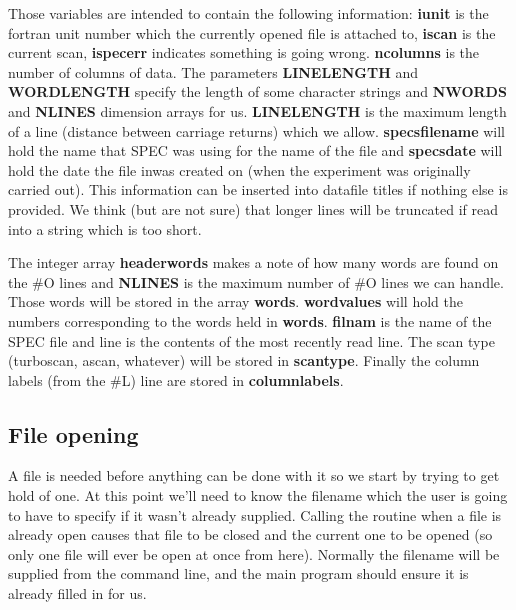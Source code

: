 \documentclass[10pt,a4paper,notitlepage]{article}
\newcommand{\var}[1]{\textbf{\textsf{#1}}} %
\newcommand{\param}[1]{\textbf{\textsf{#1}}} %
\begin{document}
Those variables are intended to contain the following information: \var{iunit} 
is the fortran unit number which the currently opened file is attached to,
\var{iscan} is the current scan, \var{ispecerr} indicates something is going 
wrong. 
\var{ncolumns} is the number of columns of data.
The parameters \param{LINELENGTH} and \param{WORDLENGTH} specify the length 
of some character strings and
\param{NWORDS} and \param{NLINES} dimension arrays for us. 
\param{LINELENGTH} is the maximum length of a line (distance between 
carriage returns) which we allow. 
\var{specsfilename} will hold the name that SPEC was using for the name
of the file and \var{specsdate} will hold the date the file
inwas created on (when the experiment was originally carried out). 
This information can be inserted into datafile titles if nothing else is
provided.
We think (but are not sure) that longer lines will be truncated if read into
a string which is too short.

The integer array \var{headerwords} makes a note of how many 
words are found on the 
\#O lines and \param{NLINES} is the maximum number of \#O lines we can handle. 
Those words will be stored in the array \var{words}.
\var{wordvalues} will hold the numbers corresponding to the words held in
\var{words}.
\var{filnam} is the name of the SPEC file and line is the 
contents of the most recently read line. 
The scan type (turboscan, ascan, whatever) will be stored in \var{scantype}.
Finally the column labels (from the \#L) line are stored in \var{columnlabels}. 

\subsection{File opening}

A file is needed before anything can be done with it so we start by trying 
to get hold of one. 
At this point we'll need to know the filename which the user is going to have
to specify if it wasn't already supplied. 
Calling the routine when a file is already open causes that file to be 
closed and the current one to be opened (so only one file will ever be open 
at once from here). 
Normally the filename will be supplied from the command line, and the 
main program should ensure it is already filled in for us.
\end{document}
